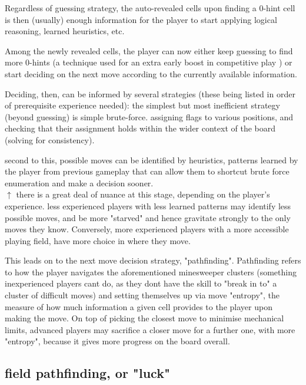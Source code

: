 Regardless of guessing strategy, the auto-revealed cells upon finding a 0-hint cell is then (usually) enough information for the player to start applying logical reasoning, learned heuristics, etc.

Among the newly revealed cells, the player can now either keep guessing to find more 0-hints (a technique used for an extra early boost in competitive play ) or start deciding on the next move according to the currently available information.

Deciding, then, can be informed by several strategies (these being listed in order of prerequisite experience needed):
the simplest but most inefficient strategy (beyond guessing) is simple brute-force.
assigning flags to various positions, and checking that their assignment holds within the wider context of the board (solving for consistency). 

second to this, possible moves can be identified by heuristics, patterns learned by the player from previous gameplay that can allow them to shortcut brute force enumeration and make a decision sooner.
\\
$\uparrow$ there is a great deal of nuance at this stage, depending on the player's experience. less experienced players with less learned patterns may identify less possible moves, and be more "starved" and hence gravitate strongly to the only moves they know.
Conversely, more experienced players with a more accessible playing field, have more choice in where they move.

This leads on to the next move decision strategy, "pathfinding".
Pathfinding refers to how the player navigates the aforementioned minesweeper clusters (something inexperienced players cant do, as they dont have the skill to "break in to" a cluster of difficult moves) and setting themselves up via move "entropy", the measure of how much information a given cell provides to the player upon making the move. On top of picking the closest move to minimise mechanical limits, advanced players may sacrifice a closer move for a further one, with more "entropy", because it gives more progress on the board overall.

\subsection{field pathfinding, or "luck"} \label{awa:pathfindingCompromiseWithHumans}
 \\
 \\
